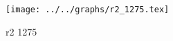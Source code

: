 \begin{figure}[h] \centering\texttt{[image: ../../graphs/r2\_1275.tex]}\caption{r2 1275}\label{gr:r2_1275} \end{figure}
